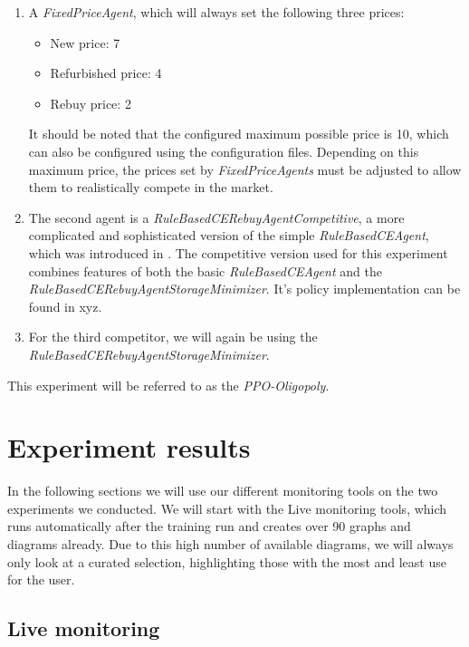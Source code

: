\begin{enumerate}
	\item A \emph{FixedPriceAgent}, which will always set the following three prices:
	      \begin{itemize}
		      \item New price: 7
		      \item Refurbished price: 4
		      \item Rebuy price: 2
	      \end{itemize}
	      It should be noted that the configured maximum possible price is 10, which can also be configured using the configuration files. Depending on this maximum price, the prices set by \emph{FixedPriceAgents} must be adjusted to allow them to realistically compete in the market.
	\item The second agent is a \emph{RuleBasedCERebuyAgentCompetitive}, a more complicated and sophisticated version of the simple \emph{RuleBasedCEAgent}, which was introduced in . The competitive version used for this experiment combines features of both the basic \emph{RuleBasedCEAgent} and the \emph{RuleBasedCERebuyAgentStorageMinimizer}. It's policy implementation can be found in xyz.
	\item For the third competitor, we will again be using the \emph{RuleBasedCERebuyAgentStorageMinimizer}.
\end{enumerate}
This experiment will be referred to as the \emph{PPO-Oligopoly}.

\section*{Experiment results}

In the following sections we will use our different monitoring tools on the two experiments we conducted. We will start with the Live monitoring tools, which runs automatically after the training run and creates over 90 graphs and diagrams already. Due to this high number of available diagrams, we will always only look at a curated selection, highlighting those with the most and least use for the user.

\subsection*{Live monitoring}

